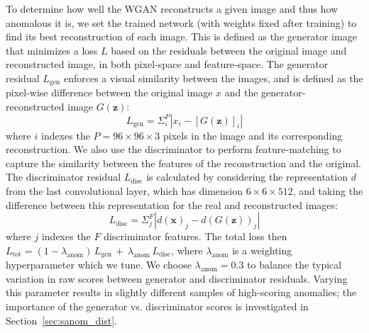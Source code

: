 To determine how well the WGAN reconstructs a given image and thus how anomalous it is, we set the trained network (with weights fixed after training) to find its best reconstruction of each image.
This is defined as the generator image that minimizes a loss $L$ based on the residuals between the original image and reconstructed image, in both pixel-space and feature-space.
The generator residual $L_\mathrm{gen}$ enforces a visual similarity between the images, and is defined as the pixel-wise difference between the original image $x$ and the generator-reconstructed image $G(\bm{z})$:
\begin{equation}
L_\mathrm{gen} = \Sigma_i^P \left| x_i - [G(\bm{z})]_i \right|
\end{equation}
where $i$ indexes the $P=96\times96\times3$ pixels in the image and its corresponding reconstruction.
We also use the discriminator to perform feature-matching to capture the similarity between the features of the reconstruction and the original.
The discriminator residual $L_\mathrm{disc}$ is calculated by considering the representation $d$ from the last convolutional layer, which has dimension $6\times6\times512$, and taking the difference between this representation for the real and reconstructed images:
\begin{equation}
L_\mathrm{disc} = \Sigma_j^F \left| d(\bm{x})_j - d(G(\bm{z}))_j \right|
\end{equation}
where $j$ indexes the $F$ discriminator features.
The total loss then $L_\mathrm{tot} = (1-\lambda_\mathrm{anom}) \, L_\mathrm{gen} \, + \, \lambda_\mathrm{anom} \, L_\mathrm{disc}$, where $\lambda_\mathrm{anom}$ is a weighting hyperparameter which we tune.
We choose $\lambda_\mathrm{anom}=0.3$ to balance the typical variation in raw scores between generator and discriminator residuals.
Varying this parameter results in slightly different samples of high-scoring anomalies; the importance of the generator vs. discriminator scores is investigated in Section~\ref{sec:sanom_dist}.

